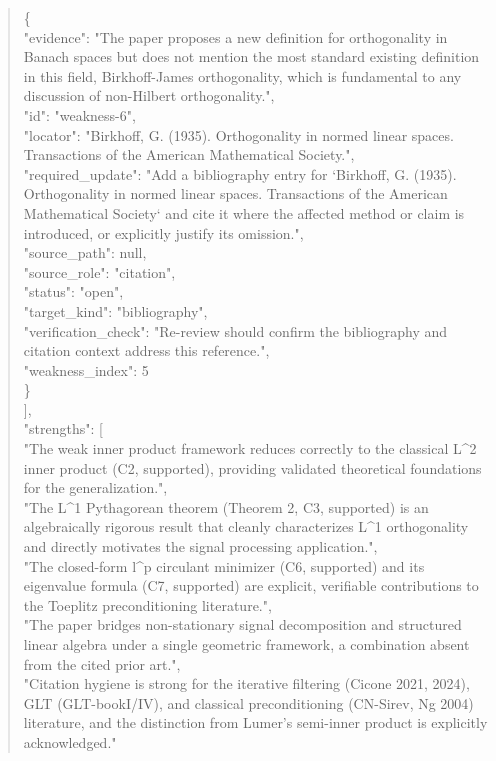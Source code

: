 \documentclass[11pt]{article}
\begin{document}
\begin{quote}
    \{\\
      "evidence": "The paper proposes a new definition for orthogonality in Banach spaces but does not mention the most standard existing definition in this field, Birkhoff-James orthogonality, which is fundamental to any discussion of non-Hilbert orthogonality.",\\
      "id": "weakness-6",\\
      "locator": "Birkhoff, G. (1935). Orthogonality in normed linear spaces. Transactions of the American Mathematical Society.",\\
      "required\_update": "Add a bibliography entry for `Birkhoff, G. (1935). Orthogonality in normed linear spaces. Transactions of the American Mathematical Society` and cite it where the affected method or claim is introduced, or explicitly justify its omission.",\\
      "source\_path": null,\\
      "source\_role": "citation",\\
      "status": "open",\\
      "target\_kind": "bibliography",\\
      "verification\_check": "Re-review should confirm the bibliography and citation context address this reference.",\\
      "weakness\_index": 5\\
    \}\\
  ],\\
  "strengths": [\\
    "The weak inner product framework reduces correctly to the classical L\^{}2 inner product (C2, supported), providing validated theoretical foundations for the generalization.",\\
    "The L\^{}1 Pythagorean theorem (Theorem 2, C3, supported) is an algebraically rigorous result that cleanly characterizes L\^{}1 orthogonality and directly motivates the signal processing application.",\\
    "The closed-form l\^{}p circulant minimizer (C6, supported) and its eigenvalue formula (C7, supported) are explicit, verifiable contributions to the Toeplitz preconditioning literature.",\\
    "The paper bridges non-stationary signal decomposition and structured linear algebra under a single geometric framework, a combination absent from the cited prior art.",\\
    "Citation hygiene is strong for the iterative filtering (Cicone 2021, 2024), GLT (GLT-bookI/IV), and classical preconditioning (CN-Sirev, Ng 2004) literature, and the distinction from Lumer's semi-inner product is explicitly acknowledged."\\

\end{quote}
\end{document}
